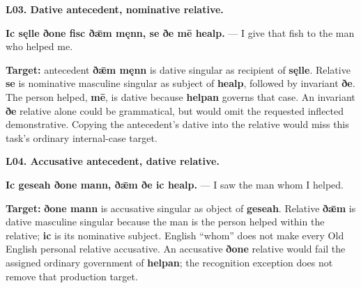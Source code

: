 \par\begin{minipage}{\linewidth}\raggedright
\textbf{L03. Dative antecedent, nominative relative.}

\textbf{Ic sęlle ðone fisc ðǣm męnn, se ðe mē healp.} — I give that fish to the man who helped me.

\textbf{Target:} antecedent \textbf{ðǣm męnn} is dative singular as recipient of \textbf{sęlle}. Relative \textbf{se} is nominative masculine singular as subject of \textbf{healp}, followed by invariant \textbf{ðe}. The person helped, \textbf{mē}, is dative because \textbf{helpan} governs that case. An invariant \textbf{ðe} relative alone could be grammatical, but would omit the requested inflected demonstrative. Copying the antecedent's dative into the relative would miss this task's ordinary internal-case target.

\end{minipage}\par\addvspace{4pt}

\par\begin{minipage}{\linewidth}\raggedright
\textbf{L04. Accusative antecedent, dative relative.}

\textbf{Ic geseah ðone mann, ðǣm ðe ic healp.} — I saw the man whom I helped.

\textbf{Target:} \textbf{ðone mann} is accusative singular as object of \textbf{geseah}. Relative \textbf{ðǣm} is dative masculine singular because the man is the person helped within the relative; \textbf{ic} is its nominative subject. English “whom” does not make every Old English personal relative accusative. An accusative \textbf{ðone} relative would fail the assigned ordinary government of \textbf{helpan}; the recognition exception does not remove that production target.

\end{minipage}\par\addvspace{4pt}

